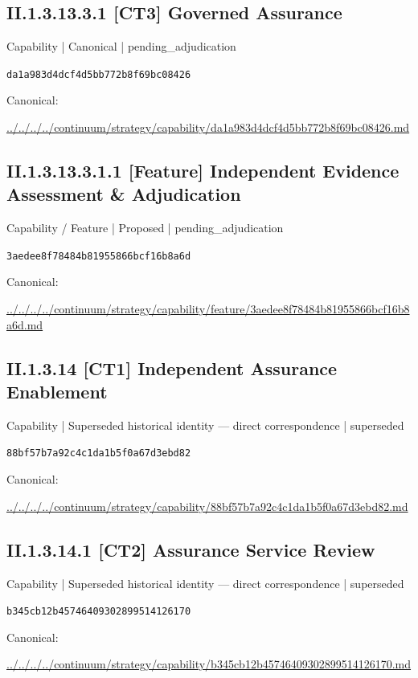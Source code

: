 \documentclass[10pt,a4paper]{article}
\begin{document}
\subsection*{II.1.3.13.3.1 [CT3] Governed Assurance}
{\small Capability | Canonical | pending\_adjudication}\par
\texttt{da1a983d4dcf4d5bb772b8f69bc08426}\par
Canonical: \par
{\footnotesize\url{../../../../continuum/strategy/capability/da1a983d4dcf4d5bb772b8f69bc08426.md}}\par
\subsection*{II.1.3.13.3.1.1 [Feature] Independent Evidence Assessment \& Adjudication}
{\small Capability / Feature | Proposed | pending\_adjudication}\par
\texttt{3aedee8f78484b81955866bcf16b8a6d}\par
Canonical: \par
{\footnotesize\url{../../../../continuum/strategy/capability/feature/3aedee8f78484b81955866bcf16b8a6d.md}}\par
\subsection*{II.1.3.14 [CT1] Independent Assurance Enablement}
{\small Capability | Superseded historical identity — direct correspondence | superseded}\par
\texttt{88bf57b7a92c4c1da1b5f0a67d3ebd82}\par
Canonical: \par
{\footnotesize\url{../../../../continuum/strategy/capability/88bf57b7a92c4c1da1b5f0a67d3ebd82.md}}\par
\subsection*{II.1.3.14.1 [CT2] Assurance Service Review}
{\small Capability | Superseded historical identity — direct correspondence | superseded}\par
\texttt{b345cb12b45746409302899514126170}\par
Canonical: \par
{\footnotesize\url{../../../../continuum/strategy/capability/b345cb12b45746409302899514126170.md}}\par
\end{document}
